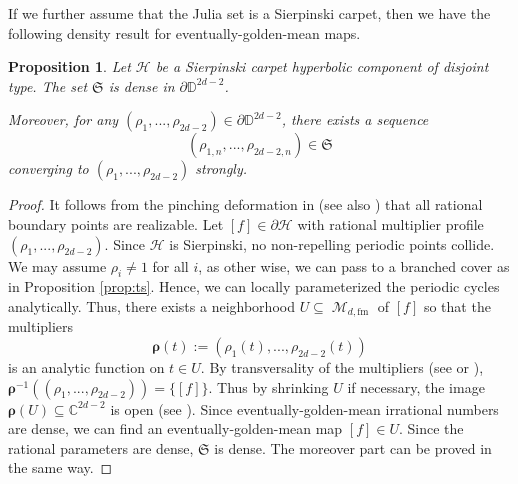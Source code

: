 \documentclass[11pt, reqno]{amsart}
\numberwithin{equation}{section}
\theoremstyle{plain}
\theoremstyle{theorem}
\newtheorem{prop}[theorem]{Proposition}
\theoremstyle{plain}
\theoremstyle{definition}
\newcommand{\C}{\mathbb{C}}
\newcommand{\D}{\mathbb{D}}
\newcommand{\fm}{\text{fm}}
\DeclareMathOperator{\M}{\mathcal{M}}
\numberwithin{figure}{section}
\begin{document}
If we further assume that the Julia set is a Sierpinski carpet, then we have the following density result for eventually-golden-mean maps.
\begin{prop}\label{prop:rl}
Let $\mathcal{H}$ be a Sierpinski carpet hyperbolic component of disjoint type.
The set $\mathfrak{S}$ is dense in $\partial \D^{2d-2}$.

Moreover, for any $(\rho_1,..., \rho_{2d-2}) \in \partial \D^{2d-2}$, there exists a sequence 
$$
(\rho_{1,n},..., \rho_{2d-2,n}) \in \mathfrak{S}
$$ 
converging to $(\rho_1,..., \rho_{2d-2})$ strongly.
\end{prop}
\begin{proof}
It follows from the pinching deformation in \cite{CT18} (see also \cite{Luo21b}) that all rational boundary points are realizable.
Let $[f] \in \partial \mathcal{H}$ with rational multiplier profile $(\rho_1,..., \rho_{2d-2})$.
Since $\mathcal{H}$ is Sierpinski, no non-repelling periodic points collide.
We may assume $\rho_i \neq 1$ for all $i$, as other wise, we can pass to a branched cover as in Proposition \ref{prop:ts}.
Hence, we can locally parameterized the periodic cycles analytically.
Thus, there exists a neighborhood $U \subseteq \M_{d,\fm}$ of $[f]$ so that the multipliers 
$$
\boldsymbol{\rho}(t):=(\rho_1(t),..., \rho_{2d-2}(t))
$$ 
is an analytic function on $t\in U$.
By transversality of the multipliers (see \cite[Theorem 6]{Lev10} or \cite{Eps09}), $\boldsymbol{\rho}^{-1}((\rho_1,..., \rho_{2d-2})) = \{[f]\}$.
Thus by shrinking $U$ if necessary, the image $\boldsymbol{\rho}(U) \subseteq \C^{2d-2}$ is open (see \cite[p. 107]{GR84}).
Since eventually-golden-mean irrational numbers are dense, we can find an eventually-golden-mean map $[f] \in U$.
Since the rational parameters are dense, $\mathfrak{S}$ is dense.
The moreover part can be proved in the same way.
\end{proof}
\end{document}
